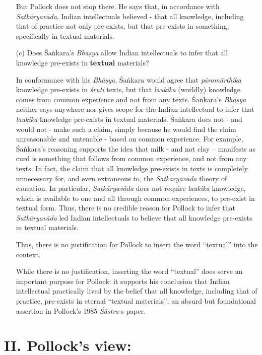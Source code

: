 \begin{itemize}
But Pollock does not stop there.  He says that, in accordance with {\sl Satkāryavāda}, Indian intellectuals believed - that all knowledge, including that of practice not only pre-exists, but that pre-exists in something; specifically in textual materials.

\item[(c)] Does Śaṅkara's {\sl Bhāṣya} allow Indian intellectuals to infer that all knowledge pre-exists  in {\bf textual} materials?

In conformance with his {\sl Bhāṣya}, Śaṅkara would agree that {\sl pāramārthika} knowledge pre-exists in {\sl śruti} texts, but that {\sl laukika} (worldly) knowledge comes from common experience and not from any texts. Śaṅ\-kara's {\sl Bhāṣya} neither says anywhere nor gives scope for the Indian intellectual to infer that {\sl laukika} knowledge pre-exists in textual materials.  Śaṅkara does not - and would not - make such a claim, simply because he would find the claim unreasonable and untenable - based on common experience. For example, Śaṅkara's reasoning supports the idea that milk - and not clay -- manifests as curd is something that follows from common experience, and not from any texts. In fact, the claim that all knowledge pre-exists in texts is completely unnecessary for, and even extraneous to, the {\sl Satkāryavāda} theory of causation. In particular, {\sl Satkāryavāda} does not require {\sl laukika} knowledge, which is available to one and all through common experiences, to pre-exist in textual form. Thus, there is no credible reason for Pollock to infer that {\sl Satkāryavāda} led Indian intellectuals to believe that all knowledge pre-exists in textual materials.

Thus, there is no justification for Pollock to insert the word ``textual'' into the context.

While there is no justification, inserting the word ``textual'' does serve an important purpose for Pollock: it supports his conclusion that Indian intellectual practically lived by the belief that all knowledge, including that of practice, pre-exists in eternal ``textual materials'', an absurd but foundational assertion in Pollock's 1985 {\sl Śāstra}-s paper.
\end{itemize}


\section*{II. Pollock's view:}

